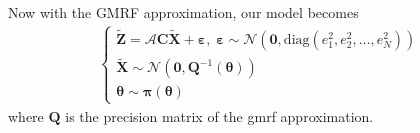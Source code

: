 \documentclass[a4paper,12pt]{article}
\begin{document}
Now with the GMRF approximation, our model becomes
\begin{align}
\left\{ \begin{array}{l}
\bm{\tilde{Z}} = \bm{\mathcal{A}}\bm{C}\bm{\tilde{X}} + \bm{\varepsilon}, \; 
\bm{\varepsilon} \sim \mathcal{N} (\bm{0}, \mbox{diag}(e_1^2, e_2^2, \dots, e_N^2)) \\
\bm{\tilde{X}} \sim \mathcal{N}(\bm{0}, \bm{Q}^{-1}(\bm{\theta})) \\
\bm{\theta} \sim \bm{\pi}(\bm{\theta})
\end{array} \right.
\end{align}
where $\bm{Q}$ is the precision matrix of the \acrshort{gmrf} approximation.

\clearpage
 
\printglossary[type=\acronymtype]
 
\printglossary
 
\end{document}
